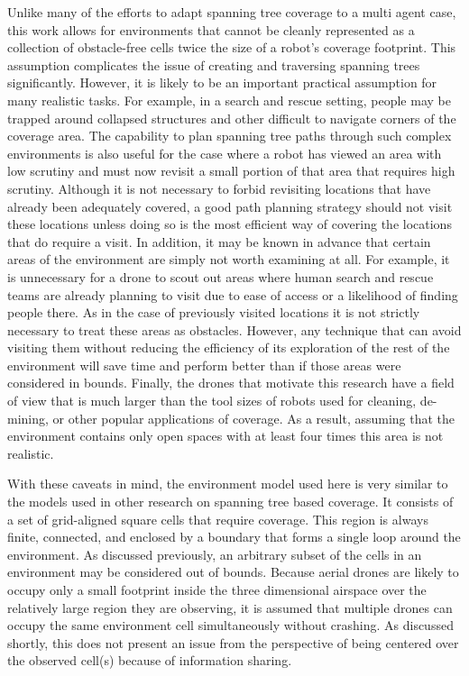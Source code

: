 Unlike many of the efforts to adapt spanning tree coverage to a multi agent case, this work allows for environments that cannot be cleanly represented as a collection of obstacle-free cells twice the size of a robot's coverage footprint. This assumption complicates the issue of creating and traversing spanning trees significantly. However, it is likely to be an important practical assumption for many realistic tasks. For example, in a search and rescue setting, people may be trapped around collapsed structures and other difficult to navigate corners of the coverage area. The capability to plan spanning tree paths through such complex environments is also useful for the case where a robot has viewed an area with low scrutiny and must now revisit a small portion of that area that requires high scrutiny. Although it is not necessary to forbid revisiting locations that have already been adequately covered, a good path planning strategy should not visit these locations unless doing so is the most efficient way of covering the locations that do require a visit. In addition, it may be known in advance that certain areas of the environment are simply not worth examining at all. For example, it is unnecessary for a drone to scout out areas where human search and rescue teams are already planning to visit due to ease of access or a likelihood of finding people there. As in the case of previously visited locations it is not strictly necessary to treat these areas as obstacles. However, any technique that can avoid visiting them without reducing the efficiency of its exploration of the rest of the environment will save time and perform better than if those areas were considered in bounds. Finally, the drones that motivate this research have a field of view that is much larger than the tool sizes of robots used for cleaning, de-mining, or other popular applications of coverage. As a result, assuming that the environment contains only open spaces with at least four times this area is not realistic.

With these caveats in mind, the environment model used here is very similar to the models used in other research on spanning tree based coverage. It consists of a set of grid-aligned square cells that require coverage. This region is always finite, connected, and enclosed by a boundary that forms a single loop around the environment. As discussed previously, an arbitrary subset of the cells in an environment may be considered out of bounds. Because aerial drones are likely to occupy only a small footprint inside the three dimensional airspace over the relatively large region they are observing, it is assumed that multiple drones can occupy the same environment cell simultaneously without crashing. As discussed shortly, this does not present an issue from the perspective of being centered over the observed cell(s) because of information sharing.


